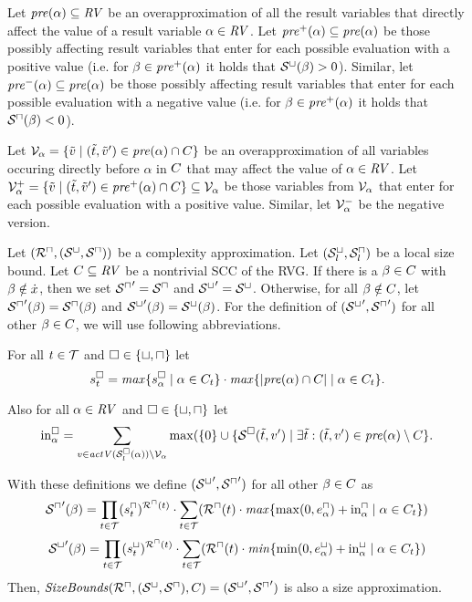 \begin{definition}
  Let $\mathit{pre}(\alpha) \subseteq \mathit{RV}$ be an overapproximation of all the result variables that directly affect the value of a result variable $\alpha \in \mathit{RV}$.
  Let $\mathit{pre}^+(\alpha) \subseteq \mathit{pre}(\alpha)$ be those possibly affecting result variables that enter for each possible evaluation with a positive value
  (i.e. for $\beta \in \mathit{pre}^+(\alpha)$ it holds that ${\mathcal{S}^\sqcup}(\beta) > 0$).
  Similar, let $\mathit{pre}^-(\alpha) \subseteq \mathit{pre}(\alpha)$ be those possibly affecting result variables that enter for each possible evaluation with a negative value
  (i.e. for $\beta \in \mathit{pre}^+(\alpha)$ it holds that ${\mathcal{S}^\sqcap}(\beta) < 0$).
\end{definition}

\begin{definition}
  Let $\mathcal{V}_\alpha = \lbrace  \tilde{v} \mid (\tilde{t}, \tilde{v}') \in \mathit{pre}(\alpha) \cap C  \rbrace$ be an overapproximation of all variables occuring directly before $\alpha$ in $C$ that may affect the value of $\alpha \in \mathit{RV}$.
  Let $\mathcal{V}^+_\alpha = \lbrace  \tilde{v} \mid (\tilde{t}, \tilde{v}') \in \mathit{pre}^+(\alpha) \cap C  \rbrace \subseteq \mathcal{V}_\alpha$ be those variables from $\mathcal{V}_\alpha$ that enter for each possible evaluation with a positive value.
  Similar, let $\mathcal{V}^-_\alpha$ be the negative version.
\end{definition}

\begin{theorem}
  Let $({\mathcal{R}^\sqcap}, {({\mathcal{S}^\sqcup}, {\mathcal{S}^\sqcap})})$ be a complexity approximation.
  Let ${({\mathcal{S}^\sqcup_l}, {\mathcal{S}^\sqcap_l})}$ be a local size bound.
  Let $C \subseteq \mathit{RV}$ be a nontrivial SCC of the RVG.
  If there is a $\beta \in C$ with $\beta \notin \dot{x}$, then we set ${\mathcal{S}^\sqcap}' = {\mathcal{S}^\sqcap}$ and ${\mathcal{S}^\sqcup}' = {\mathcal{S}^\sqcup}$.
  Otherwise, for all $\beta \notin C$, let ${\mathcal{S}^\sqcap}'(\beta) = {\mathcal{S}^\sqcap}(\beta)$ and ${\mathcal{S}^\sqcup}'(\beta) = {\mathcal{S}^\sqcup}(\beta)$.
  For the definition of $({\mathcal{S}^\sqcup}', {\mathcal{S}^\sqcap}')$ for all other $\beta \in C$, we will use following abbreviations.

  For all $t \in \mathcal{T}$ and $\square \in \lbrace \sqcup, \sqcap \rbrace$ let
  \[ s^\square_t = \mathit{max} \lbrace s^\square_{\alpha} \mid \alpha \in C_t \rbrace \cdot \mathit{max} \lbrace \left|\mathit{pre}(\alpha) \cap C\right| \mid \alpha \in C_t \rbrace. \]

  Also for all $\alpha \in \mathit{RV}$ and $\square \in \lbrace \sqcup, \sqcap \rbrace$ let
  \[ \text{in}^\square_\alpha = \sum_{v \in \mathit{actV}(\mathcal{S}^\square_l(\alpha)) \setminus \mathcal{V}_\alpha} \max(\lbrace 0 \rbrace \cup \lbrace \mathcal{S}^\square(\tilde{t}, v') \mid \exists \tilde{t}: (\tilde{t}, v') \in \mathit{pre}(\alpha) \setminus C \rbrace. \]

  With these definitions we define $({\mathcal{S}^\sqcup}', {\mathcal{S}^\sqcap}')$ for all other $\beta \in C$ as
  \[ {\mathcal{S}^\sqcap}'(\beta) = \prod_{t \in \mathcal{T}} (s^\sqcap_t)^{{\mathcal{R}^\sqcap}(t)} \cdot \sum_{t \in \mathcal{T}} ({\mathcal{R}^\sqcap}(t) \cdot \mathit{max} \lbrace \max(0, e^{\sqcap}_\alpha) + \text{in}^\sqcap_\alpha \mid \alpha \in C_t  \rbrace) \]
  \[ {\mathcal{S}^\sqcup}'(\beta) = \prod_{t \in \mathcal{T}} (s^\sqcup_t)^{{\mathcal{R}^\sqcap}(t)} \cdot \sum_{t \in \mathcal{T}} ({\mathcal{R}^\sqcap}(t) \cdot \mathit{min} \lbrace \min(0, e^{\sqcup}_\alpha) + \text{in}^\sqcup_\alpha \mid \alpha \in C_t  \rbrace) \]
  Then, $\mathit{SizeBounds}({\mathcal{R}^\sqcap}, {({\mathcal{S}^\sqcup}, {\mathcal{S}^\sqcap})}, C) = ({\mathcal{S}^\sqcup}', {\mathcal{S}^\sqcap}')$ is also a size approximation. 
\end{theorem}
